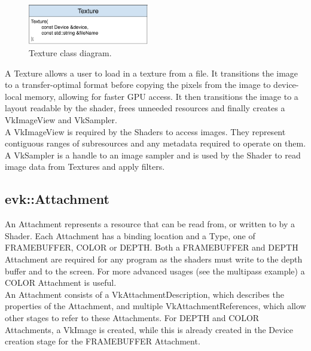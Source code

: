 \documentclass[12pt]{report}
\newcommand{\figurewidth}{0.55\textwidth}
\newcommand{\imagewidth}{0.47\textwidth}
\theoremstyle{definition}
\begin{document}
        \begin{figure}
          \centering
          \includegraphics[width=\imagewidth]{images/class_texture.png}
          \caption{Texture class diagram.}
          \label{fig:class_texture}  
        \end{figure}

        A Texture allows a user to load in a texture from a file. It transitions
        the image to a transfer-optimal format before copying the pixels from
        the image to device-local memory, allowing for faster GPU access. It
        then transitions the image to a layout readable by the shader, frees
        unneeded resources and finally creates a VkImageView and VkSampler. \\

        A VkImageView is required by the Shaders to access images. They
        represent contiguous ranges of subresources and any metadata
        required to operate on them. A VkSampler is a handle to an image
        sampler and is used by the Shader to read image data from Textures
        and apply filters.

      \subsection{evk::Attachment}

        An Attachment represents a resource that can be read from, or written
        to by a Shader. Each Attachment has a binding location and a Type, one
        of FRAMEBUFFER, COLOR or DEPTH. Both a FRAMEBUFFER and DEPTH Attachment
        are required for any program as the shaders must write to the depth
        buffer and to the screen. For more advanced usages (see the multipass
        example) a COLOR Attachment is useful. \\

        An Attachment consists of a VkAttachmentDescription, which describes
        the properties of the Attachment, and multiple VkAttachmentReferences,
        which allow other stages to refer to these Attachments. For DEPTH and
        COLOR Attachments, a VkImage is created, while this is already created
        in the Device creation stage for the FRAMEBUFFER Attachment. \\
\end{document}
